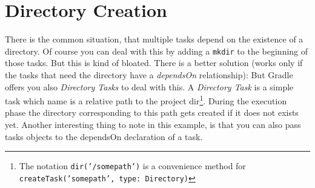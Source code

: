 \section{Directory Creation} %
\label{sec:directory_creation}
There is the common situation, that multiple tasks depend on the existence of a directory. Of course you can deal with this by adding a \texttt{mkdir} to the beginning of those tasks. But this is kind of bloated. 
There is a better solution (works only if the tasks that need the directory have a \emph{dependsOn} relationship):
But Gradle offers you also \emph{Directory Tasks} to deal with this.
A \emph{Directory Task} is a simple task which name is a relative path to the project dir\footnote{The notation \texttt{dir('/somepath')} is a convenience method for \texttt{createTask('somepath', type: Directory)}}. During the execution phase the directory corresponding to this path gets created if it does not exists yet. Another interesting thing to note in this example, is that you can also pass tasks objects to the dependsOn declaration of a task.
